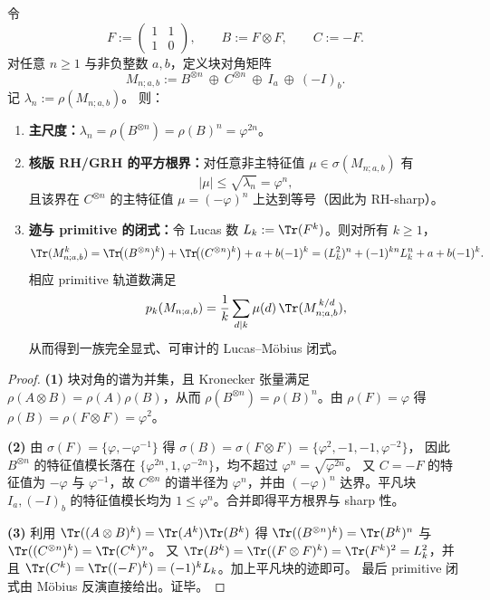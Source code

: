 \begin{theorem}\label{thm:fib-tensor-rhsharp-closure}
令
\[
F:=\begin{pmatrix}1&1\\[2pt]1&0\end{pmatrix},\qquad
B:=F\otimes F,\qquad
C:=-F.
\]
对任意 $n\ge 1$ 与非负整数 $a,b$，定义块对角矩阵
\[
M_{n;a,b}:=B^{\otimes n}\ \oplus\ C^{\otimes n}\ \oplus\ I_a\ \oplus\ (-I)_b.
\]
记
\(
\lambda_n:=\rho(M_{n;a,b})
\)。
则：
\begin{enumerate}
  \item \textbf{主尺度：}$\lambda_n=\rho(B^{\otimes n})=\rho(B)^n=\varphi^{2n}$。
  \item \textbf{核版 RH/GRH 的平方根界：}对任意非主特征值 $\mu\in\sigma(M_{n;a,b})$ 有
  \[
  |\mu|\le \sqrt{\lambda_n}=\varphi^{n},
  \]
  且该界在 $C^{\otimes n}$ 的主特征值 $\mu=(-\varphi)^n$ 上达到等号（因此为 RH-sharp）。
  \item \textbf{迹与 primitive 的闭式：}令 Lucas 数 $L_k:=\Tr(F^k)$。则对所有 $k\ge 1$，
  \[
  \Tr(M_{n;a,b}^k)
  =
  \Tr\!\bigl((B^{\otimes n})^k\bigr)+\Tr\!\bigl((C^{\otimes n})^k\bigr)+a+b(-1)^k
  =
  (L_k^2)^{n}+(-1)^{kn}L_k^{n}+a+b(-1)^k.
  \]
  相应 primitive 轨道数满足
  \[
  p_k(M_{n;a,b})=\frac{1}{k}\sum_{d\mid k}\mu(d)\,\Tr(M_{n;a,b}^{\,k/d}),
  \]
  从而得到一族完全显式、可审计的 Lucas--Möbius 闭式。
\end{enumerate}
\end{theorem}
\begin{proof}
\textbf{(1)} 块对角的谱为并集，且 Kronecker 张量满足 $\rho(A\otimes B)=\rho(A)\rho(B)$，从而 $\rho(B^{\otimes n})=\rho(B)^n$。由 $\rho(F)=\varphi$ 得 $\rho(B)=\rho(F\otimes F)=\varphi^2$。

\textbf{(2)} 由 $\sigma(F)=\{\varphi,-\varphi^{-1}\}$ 得
\(
\sigma(B)=\sigma(F\otimes F)=\{\varphi^2,-1,-1,\varphi^{-2}\}
\)，
因此 $B^{\otimes n}$ 的特征值模长落在 $\{\varphi^{2n},1,\varphi^{-2n}\}$，均不超过 $\varphi^{n}=\sqrt{\varphi^{2n}}$。
又 $C=-F$ 的特征值为 $-\varphi$ 与 $\varphi^{-1}$，故 $C^{\otimes n}$ 的谱半径为 $\varphi^{n}$，并由 $(-\varphi)^n$ 达界。平凡块 $I_a,(-I)_b$ 的特征值模长均为 $1\le \varphi^{n}$。合并即得平方根界与 sharp 性。

\textbf{(3)} 利用 $\Tr((A\otimes B)^k)=\Tr(A^k)\Tr(B^k)$ 得 $\Tr((B^{\otimes n})^k)=\Tr(B^k)^n$ 与 $\Tr((C^{\otimes n})^k)=\Tr(C^k)^n$。
又 $\Tr(B^k)=\Tr((F\otimes F)^k)=\Tr(F^k)^2=L_k^2$，并且 $\Tr(C^k)=\Tr((-F)^k)=(-1)^k L_k$。加上平凡块的迹即可。
最后 primitive 闭式由 Möbius 反演直接给出。证毕。
\end{proof}

